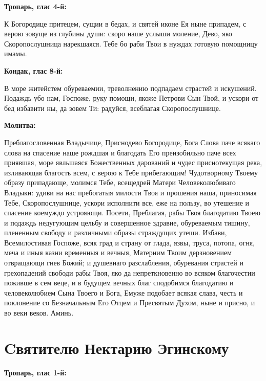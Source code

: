 \bfseries Тропарь, глас 4-й:\normalfont{}\nopagebreak


К Богородице притецем, сущии в бедах, и святей иконе Ея ныне припадем, с верою зовуще из глубины души: скоро наше услыши моление, Дево, яко Скоропослушница нарекшаяся. Тебе бо раби Твои в нуждах готовую помощницу имамы.


\medskip


\bfseries Кондак, глас 8-й:\normalfont{}\nopagebreak


В море житейстем обуреваемии, треволнению подпадаем страстей и искушений. Подаждь убо нам, Госпоже, руку помощи, якоже Петрови Сын Твой, и ускори от бед избавити ны, да зовем Ти: радуйся, всеблагая Скоропослушнице.


\medskip


\bfseries Молитва:\normalfont{}\nopagebreak


Преблагословенная Владычице, Приснодево Богородице, Бога Слова паче всякаго слова на спасение наше рождшая и благодать Его преизобильно паче всех приявшая, море явльшаяся Божественных дарований и чудес приснотекущая река, изливающая благость всем, с верою к Тебе прибегающим! Чудотворному Твоему образу припадающе, молимся Тебе, всещедрей Матери Человеколюбиваго Владыки: удиви на нас пребогатыя милости Твоя и прошения наша, приносимая Тебе, Скоропослушнице, ускори исполнити все, еже на пользу, во утешение и спасение коемуждо устрояющи. Посети, Преблагая, рабы Твоя благодатию Твоею и подаждь недугующим цельбу и совершенное здравие, обуреваемым тишину, плененным свободу и различными образы страждущих утеши. Избави, Всемилостивая Госпоже, всяк град и страну от глада, язвы, труса, потопа, огня, меча и иныя казни временныя и вечныя, Матерним Твоим дерзновением отвращающи гнев Божий; и душевнаго разслабления, обуревания страстей и грехопадений свободи рабы Твоя, яко да непреткновенно во всяком благочестии поживше в сем веце, и в будущем вечных благ сподобимся благодатию и человеколюбием Сына Твоего и Бога, Емуже подобает всякая слава, честь и поклонение со Безначальным Его Отцем и Пресвятым Духом, ныне и присно, и во веки веков. Аминь.


\section{Cвятителю Нектарию Эгинскому}
 


\bfseries Тропарь, глас 1-й:\normalfont{}\nopagebreak



